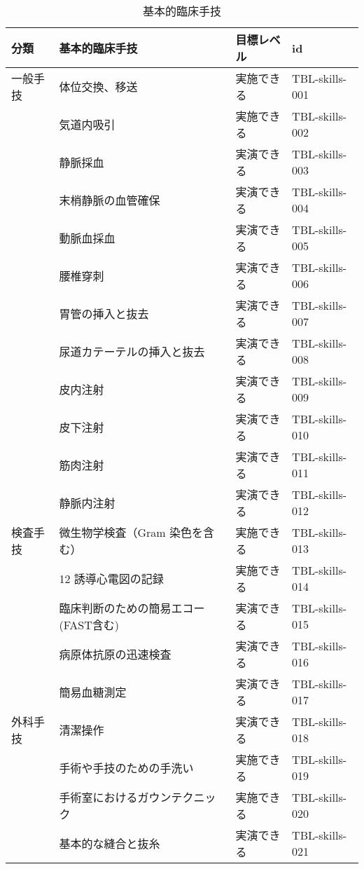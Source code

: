 \begin{xltabular}{\linewidth}{XXXX}
\caption{\label{tbl:skills}基本的臨床手技} \\
\toprule
分類 & 基本的臨床手技 & 目標レベル & id \\
\midrule
\endhead
一般手技 & 体位交換、移送 & 実施できる & TBL-skills-001 \\
 & 気道内吸引 & 実施できる & TBL-skills-002 \\
 & 静脈採血 & 実演できる & TBL-skills-003 \\
 & 末梢静脈の血管確保 & 実演できる & TBL-skills-004 \\
 & 動脈血採血 & 実演できる & TBL-skills-005 \\
 & 腰椎穿刺 & 実演できる & TBL-skills-006 \\
 & 胃管の挿入と抜去 & 実演できる & TBL-skills-007 \\
 & 尿道カテーテルの挿入と抜去 & 実演できる & TBL-skills-008 \\
 & 皮内注射 & 実演できる & TBL-skills-009 \\
 & 皮下注射 & 実演できる & TBL-skills-010 \\
 & 筋肉注射 & 実演できる & TBL-skills-011 \\
 & 静脈内注射 & 実演できる & TBL-skills-012 \\
検査手技 & 微生物学検査（Gram 染色を含む） & 実施できる & TBL-skills-013 \\
 & 12 誘導心電図の記録 & 実施できる & TBL-skills-014 \\
 & 臨床判断のための簡易エコー(FAST含む) & 実演できる & TBL-skills-015 \\
 & 病原体抗原の迅速検査 & 実演できる & TBL-skills-016 \\
 & 簡易血糖測定 & 実演できる & TBL-skills-017 \\
外科手技 & 清潔操作 & 実演できる & TBL-skills-018 \\
 & 手術や手技のための手洗い & 実施できる & TBL-skills-019 \\
 & 手術室におけるガウンテクニック & 実施できる & TBL-skills-020 \\
 & 基本的な縫合と抜糸 & 実演できる & TBL-skills-021 \\
\bottomrule
\end{xltabular}

